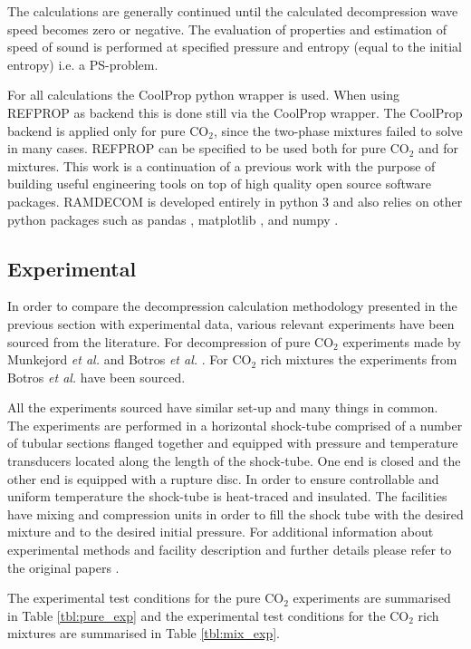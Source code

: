 \documentclass[a4paper, 10pt, twocolumn, twoside]{scrartcl}
\begin{document}
The calculations are generally continued until the calculated decompression wave speed becomes zero or negative. The evaluation of properties and estimation of speed of sound is performed at specified pressure and entropy (equal to the initial entropy) i.e. a PS-problem. 

For all calculations the CoolProp python wrapper is used. When using REFPROP as backend this is done still via the CoolProp wrapper. The CoolProp backend is applied only for pure CO$_2$, since the two-phase mixtures failed to solve in many cases. REFPROP can be specified to be used both for pure CO$_2$ and for mixtures. This work is a continuation of a previous work \cite{Andreasen2021} with the purpose of building useful engineering tools on top of high quality open source software packages. RAMDECOM is developed entirely in python 3 and also relies on other python packages such as pandas \cite{mckinney-proc-scipy-2010}, matplotlib \cite{Hunter:2007}, and numpy \cite{harris2020array}. 


\subsection{Experimental}
In order to compare the decompression calculation methodology presented in the previous section with experimental data, various relevant experiments have been sourced from the literature. For decompression of pure CO$_2$ experiments made by Munkejord \emph{et al.} \cite{MUNKEJORD2020118560} and Botros \emph{et al.} \cite{Botros_pure}. For CO$_2$ rich mixtures the experiments from Botros \emph{et al.} \cite{Botros_mixture} have been sourced. 

All the experiments sourced have similar set-up and many things in common. The experiments are performed in a horizontal shock-tube comprised of a number of tubular sections flanged together and equipped with pressure and temperature transducers located along the length of the shock-tube. One end is closed and the other end is equipped with a rupture disc. In order to ensure controllable and uniform temperature the shock-tube is heat-traced and insulated. The facilities have mixing and compression units in order to fill the shock tube with the desired mixture and to the desired initial pressure. For additional information about experimental methods and facility description and further details please refer to the original papers \cite{MUNKEJORD2020118560,Botros_pure}.

The experimental test conditions for the pure CO$_2$ experiments are summarised in Table \ref{tbl:pure_exp} and the experimental test conditions for the CO$_2$ rich mixtures are summarised in Table \ref{tbl:mix_exp}.
\end{document}
